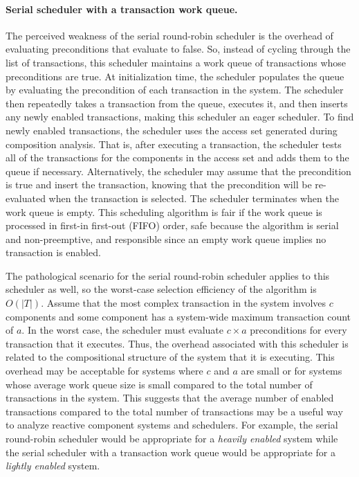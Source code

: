 \paragraph{Serial scheduler with a transaction work queue.}
The perceived weakness of the serial round-robin scheduler is the overhead of evaluating preconditions that evaluate to false.
So, instead of cycling through the list of transactions, this scheduler maintains a work queue of transactions whose preconditions are true.
At initialization time, the scheduler populates the queue by evaluating the precondition of each transaction in the system.
The scheduler then repeatedly takes a transaction from the queue, executes it, and then inserts any newly enabled transactions, making this scheduler an eager scheduler.
To find newly enabled transactions, the scheduler uses the access set generated during composition analysis.
That is, after executing a transaction, the scheduler tests all of the transactions for the components in the access set and adds them to the queue if necessary.
Alternatively, the scheduler may assume that the precondition is true and insert the transaction, knowing that the precondition will be re-evaluated when the transaction is selected.
The scheduler terminates when the work queue is empty.
This scheduling algorithm is fair if the work queue is processed in first-in first-out (FIFO) order, safe because the algorithm is serial and non-preemptive, and responsible since an empty work queue implies no transaction is enabled.

The pathological scenario for the serial round-robin scheduler applies to this scheduler as well, so the worst-case selection efficiency of the algorithm is $O(|T|)$.
Assume that the most complex transaction in the system involves $c$ components and some component has a system-wide maximum transaction count of $a$.
In the worst case, the scheduler must evaluate $c \times a$ preconditions for every transaction that it executes.
Thus, the overhead associated with this scheduler is related to the compositional structure of the system that it is executing.
This overhead may be acceptable for systems where $c$ and $a$ are small or for systems whose average work queue size is small compared to the total number of transactions in the system.
This suggests that the average number of enabled transactions compared to the total number of transactions may be a useful way to analyze reactive component systems and schedulers.
For example, the serial round-robin scheduler would be appropriate for a \emph{heavily enabled} system while the serial scheduler with a transaction work queue would be appropriate for a \emph{lightly enabled} system.

